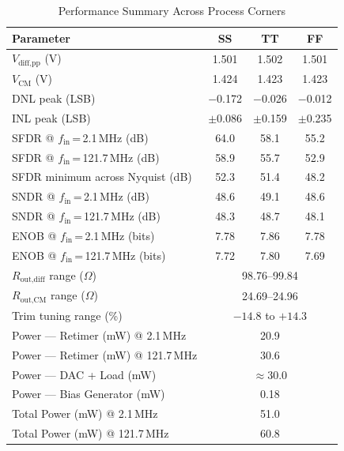 \documentclass[lettersize,journal]{IEEEtran}
\begin{document}
\begin{table}[!h]
  \renewcommand{\arraystretch}{1.2}
  \caption{Performance Summary Across Process Corners}
  \label{tab:perf}
  \centering
  \begin{tabular}{lccc}
    \toprule
    Parameter & SS & TT & FF \\
    \midrule
    $V_\text{diff,pp}$ (V)                        & 1.501 & 1.502 & 1.501 \\
    $V_\text{CM}$ (V)                             & 1.424 & 1.423 & 1.423 \\
    \midrule
    DNL peak (LSB)                                & $-$0.172 & $-$0.026 & $-$0.012 \\
    INL peak (LSB)                                & $\pm$0.086 & $\pm$0.159 & $\pm$0.235 \\
    \midrule
    SFDR @ $f_\text{in}$\,=\,2.1\,MHz (dB)       & 64.0  & 58.1  & 55.2  \\
    SFDR @ $f_\text{in}$\,=\,121.7\,MHz (dB)     & 58.9  & 55.7  & 52.9  \\
    SFDR minimum across Nyquist (dB)              & 52.3  & 51.4  & 48.2  \\
    \midrule
    SNDR @ $f_\text{in}$\,=\,2.1\,MHz (dB)       & 48.6  & 49.1  & 48.6  \\
    SNDR @ $f_\text{in}$\,=\,121.7\,MHz (dB)     & 48.3  & 48.7  & 48.1  \\
    \midrule
    ENOB @ $f_\text{in}$\,=\,2.1\,MHz (bits)     & 7.78  & 7.86  & 7.78  \\
    ENOB @ $f_\text{in}$\,=\,121.7\,MHz (bits)   & 7.72  & 7.80  & 7.69  \\
    \midrule
    $R_\text{out,diff}$ range ($\Omega$)           & \multicolumn{3}{c}{98.76–99.84} \\
    $R_\text{out,CM}$ range ($\Omega$)            & \multicolumn{3}{c}{24.69–24.96} \\
    Trim tuning range (\%)                        & \multicolumn{3}{c}{$-14.8$ to $+14.3$} \\
    \midrule
    Power — Retimer (mW) @ 2.1\,MHz              & \multicolumn{3}{c}{20.9} \\
    Power — Retimer (mW) @ 121.7\,MHz            & \multicolumn{3}{c}{30.6} \\
    Power — DAC + Load (mW)                      & \multicolumn{3}{c}{$\approx$30.0} \\
    Power — Bias Generator (mW)                  & \multicolumn{3}{c}{0.18} \\
    Total Power (mW) @ 2.1\,MHz         & \multicolumn{3}{c}{51.0} \\
    Total Power (mW) @ 121.7\,MHz       & \multicolumn{3}{c}{60.8} \\
    \bottomrule
  \end{tabular}
\end{table}
\end{document}
